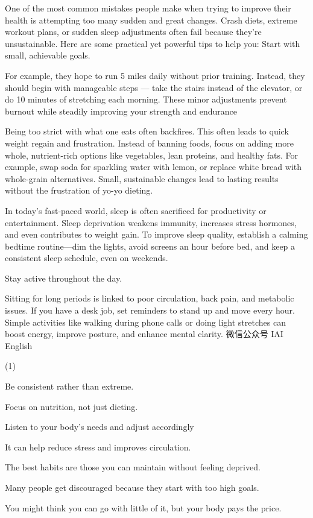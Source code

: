 \documentclass{英语试卷}
\begin{document}
\par One of the most common mistakes people make when trying to improve their health is attempting too many sudden and great changes. Crash diets, extreme workout plans, or sudden sleep adjustments often fail because they're unsustainable.  Here are some practical yet powerful tips to help you: Start with small, achievable goals.\par
\par {} For example, they hope to run 5 miles daily without prior training. Instead, they should begin with manageable steps — take the stairs instead of the elevator, or do 10 minutes of stretching each morning. These minor adjustments prevent burnout while steadily improving your strength and endurance \par
\par Being too strict with what one eats often backfires. This often leads to quick weight regain and frustration. Instead of banning foods, focus on adding more whole, nutrient-rich options like vegetables, lean proteins, and healthy fats. For example, swap soda for sparkling water with lemon, or replace white bread with whole-grain alternatives. Small, sustainable changes lead to lasting results without the frustration of yo-yo dieting.\par
\par In today's fast-paced world, sleep is often sacrificed for productivity or entertainment.  Sleep deprivation weakens immunity, increases stress hormones, and even contributes to weight gain. To improve sleep quality, establish a calming bedtime routine—dim the lights, avoid screens an hour before bed, and keep a consistent sleep schedule, even on weekends.\par
\par Stay active throughout the day.\par
\par Sitting for long periods is linked to poor circulation, back pain, and metabolic issues. If you have a desk job, set reminders to stand up and move every hour.  Simple activities like walking during phone calls or doing light stretches can boost energy, improve posture, and enhance mental clarity. 微信公众号 IAI English\par
\begin{choices}(1)
  \item Be consistent rather than extreme.
  \item Focus on nutrition, not just dieting.
  \item Listen to your body's needs and adjust accordingly
  \item It can help reduce stress and improves circulation.
  \item The best habits are those you can maintain without feeling deprived.
  \item Many people get discouraged because they start with too high goals.
  \item You might think you can go with little of it, but your body pays the price.
\end{choices}
\end{document}
